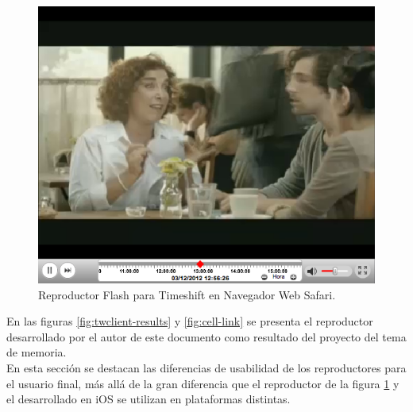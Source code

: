 \begin{figure}[H]
	\centering
	\includegraphics[scale=0.42]{imgs/eag-player.png} 
	\caption{Reproductor Flash para Timeshift en Navegador Web Safari.}
	\label{fig:eag-player}
\end{figure}  

En las figuras \ref{fig:twclient-results} y \ref{fig:cell-link} se presenta el reproductor desarrollado por el autor de este documento como resultado del proyecto del tema de memoria.\\

En esta sección se destacan las diferencias de usabilidad de los reproductores para el usuario final, más allá de la gran diferencia que el reproductor de la figura \ref{fig:eag-player} y el desarrollado en iOS se utilizan en plataformas distintas. 

